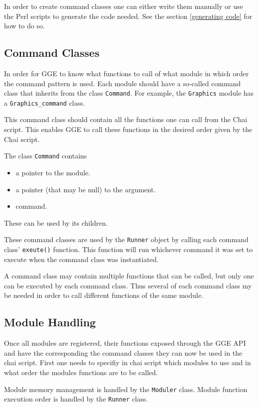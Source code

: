 \documentclass{article}
\begin{document}
In order to create command classes one can either write them manually or use the Perl scripts to generate the code
needed. See the section \ref{generating code} for how to do so.

\subsection{Command Classes} 
In order for GGE to know what functions to call of what module in which order the command pattern is used.
Each module should have a so-called command class that inherits from the class \verb|Command|.
For example, the \verb|Graphics| module has a \verb|Graphics_command| class.

This command class should contain all the functions one can call from the Chai script. 
This enables GGE to call these functions in the desired order given by the Chai script.

The class \verb|Command| contains
\begin{itemize}
	\item a pointer to the module.
	\item a pointer (that may be null) to the argument.
	\item command.
\end{itemize}
These can be used by its children.

These command classes are used by the \verb|Runner| object by calling each command class' \verb|exeute()| function.
This function will run whichever command it was set to execute when the command class was instantiated.

A command class may contain multiple functions that can be called, but only one can be executed by each command class.
Thus several of each command class my be needed in order to call different functions of the same module.

\subsection{Module Handling}
Once all modules are registered, their functions exposed through the GGE API and have the corresponding 
the command classes they can now be used in the chai script. First one needs to specifiy in chai script which modules
to use and in what order the modules functions are to be called. 

Module memory management is handled by the \verb|Moduler| class.
Module function execution order is handled by the \verb|Runner| class.
\end{document}
